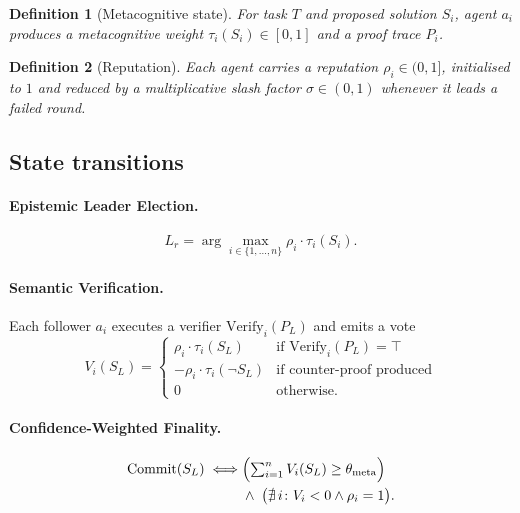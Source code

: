 \documentclass[11pt,conference]{IEEEtran}
\newtheorem{definition}{Definition}
\newcommand{\tauconf}{\tau}
\newcommand{\thetameta}{\theta_{\text{meta}}}
\begin{document}
\begin{definition}[Metacognitive state]
For task $T$ and proposed solution $S_i$, agent $a_i$ produces a
\emph{metacognitive weight} $\tauconf_i(S_i) \in [0,1]$ and a proof
trace $P_i$.
\end{definition}

\begin{definition}[Reputation]
Each agent carries a reputation $\rho_i \in (0, 1]$, initialised to $1$
and reduced by a multiplicative \emph{slash factor} $\sigma \in (0,1)$
whenever it leads a failed round.
\end{definition}

\subsection{State transitions}

\paragraph*{Epistemic Leader Election.}
\begin{equation}
L_r = \arg\max_{i \in \{1,\dots,n\}} \rho_i \cdot \tauconf_i(S_i).
\label{eq:leader}
\end{equation}

\paragraph*{Semantic Verification.}
Each follower $a_i$ executes a verifier $\mathrm{Verify}_i(P_L)$ and
emits a vote
\begin{equation}
V_i(S_L) =
\begin{cases}
\rho_i \cdot \tauconf_i(S_L) & \text{if } \mathrm{Verify}_i(P_L) = \top \\
-\rho_i \cdot \tauconf_i(\neg S_L) & \text{if counter-proof produced} \\
0 & \text{otherwise.}
\end{cases}
\label{eq:vote}
\end{equation}

\paragraph*{Confidence-Weighted Finality.}
\begin{equation}
\begin{aligned}
\mathrm{Commit}(S_L) \iff
&\Bigl(\textstyle\sum_{i=1}^{n} V_i(S_L) \ge \thetameta\Bigr) \\
&\wedge\;\bigl(\nexists\, i \colon V_i < 0 \wedge \rho_i = 1\bigr).
\end{aligned}
\label{eq:commit}
\end{equation}
\end{document}
